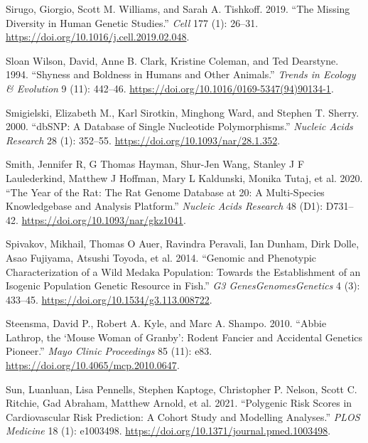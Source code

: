 \documentclass[
]{book}
\newlength{\cslhangindent}
\newlength{\cslentryspacingunit} %
\newenvironment{CSLReferences}[2] %
 {%
  \setlength{\parindent}{0pt}
  \ifodd #1
  \let\oldpar\par
  \def\par{\hangindent=\cslhangindent\oldpar}
  \fi
  \setlength{\parskip}{#2\cslentryspacingunit}
 }%
 {}
\begin{document}
\begin{CSLReferences}{1}{0}
\leavevmode{}%
Sirugo, Giorgio, Scott M. Williams, and Sarah A. Tishkoff. 2019. {``The {Missing Diversity} in {Human Genetic Studies}.''} \emph{Cell} 177 (1): 26--31. \url{https://doi.org/10.1016/j.cell.2019.02.048}.

\leavevmode{}%
Sloan Wilson, David, Anne B. Clark, Kristine Coleman, and Ted Dearstyne. 1994. {``Shyness and Boldness in Humans and Other Animals.''} \emph{Trends in Ecology \& Evolution} 9 (11): 442--46. \url{https://doi.org/10.1016/0169-5347(94)90134-1}.

\leavevmode{}%
Smigielski, Elizabeth M., Karl Sirotkin, Minghong Ward, and Stephen T. Sherry. 2000. {``{dbSNP}: A Database of Single Nucleotide Polymorphisms.''} \emph{Nucleic Acids Research} 28 (1): 352--55. \url{https://doi.org/10.1093/nar/28.1.352}.

\leavevmode{}%
Smith, Jennifer R, G Thomas Hayman, Shur-Jen Wang, Stanley J F Laulederkind, Matthew J Hoffman, Mary L Kaldunski, Monika Tutaj, et al. 2020. {``The {Year} of the {Rat}: {The Rat Genome Database} at 20: A Multi-Species Knowledgebase and Analysis Platform.''} \emph{Nucleic Acids Research} 48 (D1): D731--42. \url{https://doi.org/10.1093/nar/gkz1041}.

\leavevmode{}%
Spivakov, Mikhail, Thomas O Auer, Ravindra Peravali, Ian Dunham, Dirk Dolle, Asao Fujiyama, Atsushi Toyoda, et al. 2014. {``Genomic and {Phenotypic Characterization} of a {Wild Medaka Population}: {Towards} the {Establishment} of an {Isogenic Population Genetic Resource} in {Fish}.''} \emph{G3 Genes\textbar Genomes\textbar Genetics} 4 (3): 433--45. \url{https://doi.org/10.1534/g3.113.008722}.

\leavevmode{}%
Steensma, David P., Robert A. Kyle, and Marc A. Shampo. 2010. {``Abbie {Lathrop}, the {`{Mouse Woman} of {Granby}'}: {Rodent Fancier} and {Accidental Genetics Pioneer}.''} \emph{Mayo Clinic Proceedings} 85 (11): e83. \url{https://doi.org/10.4065/mcp.2010.0647}.

\leavevmode{}%
Sun, Luanluan, Lisa Pennells, Stephen Kaptoge, Christopher P. Nelson, Scott C. Ritchie, Gad Abraham, Matthew Arnold, et al. 2021. {``Polygenic Risk Scores in Cardiovascular Risk Prediction: {A} Cohort Study and Modelling Analyses.''} \emph{PLOS Medicine} 18 (1): e1003498. \url{https://doi.org/10.1371/journal.pmed.1003498}.


\end{CSLReferences}
\end{document}
